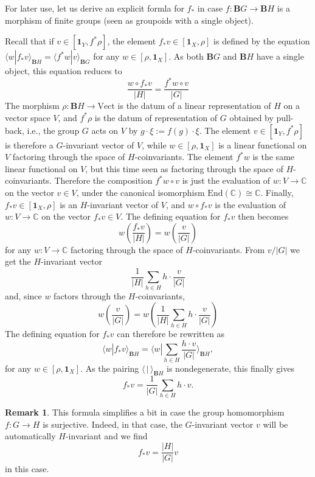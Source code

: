 \documentclass[12pt]{scrartcl}
\theoremstyle{definition}
\newtheorem{remark}[definition]{Remark}
\numberwithin{equation}{section}
\numberwithin{definition}{section}
\numberwithin{figure}{section}
\begin{document}
For  later use, let us derive an explicit formla for $f_*$ in case $f\colon \mathbf{B}G\to \mathbf{B}H$ is a morphism of finite groups (seen as groupoids with a single object).

 Recall that  if $v\in [\mathbf{1}_Y,f^*\rho]$, the element $f_*v\in [\mathbf{1}_X,\rho]$ is defined 
 by the equation $
\langle w| f_*v\rangle_{\mathbf{B}H} = \langle f^*w| v\rangle_{\mathbf{B}G}$
for any $w\in [\rho,\mathbf{1}_X]$. As both $\mathbf{B}G$ and $\mathbf{B}H$ have a single object, this equation reduces to
\[
\frac{w\circ f_*v}{|H|}=\frac{f^*w\circ v}{|G|}
\] 
The morphism $\rho\colon \mathbf{B}H\to \mathrm{Vect}$ is the datum of a linear representation of $H$ on a vector space $V$, and $f^*\rho$ is the datum of representation of $G$ obtained by pull-back, i.e., the group $G$ acts on $V$ by $g\cdot \xi := f(g)\cdot \xi$. The element $v\in [\mathbf{1}_Y,f^*\rho]$ is therefore a $G$-invariant vector of $V$, while $w\in [\rho,\mathbf{1}_X]$ is a linear functional on $V$ factoring through the space of $H$-coinvariants. The element $f^*w$ is the same linear functional on $V$, but this time seen as factoring through the space of $H$-coinvariants. Therefore the composition $f^*w\circ v$ is just the evaluation of $w\colon V\to \mathbb{C}$ on the vector $v\in V$, under the canonical isomorphism $\mathrm{End}(\mathbb{C})\cong \mathbb{C}$. Finally, $f_*v\in  [\mathbf{1}_X,\rho]$ is an $H$-invariant vector of $V$, and $w\circ f_*v$ is the evaluation of $w\colon V\to \mathbb{C}$ on the vector $f_*v\in V$. The defining equation for $f_*v$ then becomes
\[
w\left(\frac{f_*v}{|H|}\right)=w\left(\frac{v}{|G|}\right)
\] 
for any $w\colon V\to \mathbb{C}$ factoring through the space of $H$-coinvariants.
From $v/|G|$ we get the $H$-invariant vector 
\[
\frac{1}{|H|}\sum_{h\in H}h\cdot \frac{v}{|G|}
\]
and, since $w$ factors through the $H$-coinvariants,
\[
w\left(\frac{v}{|G|}\right)=w\left(\frac{1}{|H|}\sum_{h\in H}h\cdot \frac{v}{|G|}\right)
\]
The defining equation for $f_*v$ can therefore be rewritten as
\[
\langle w| f_*v\rangle_{\mathbf{B}H}=\langle w| \sum_{h\in H}\frac{h\cdot v}{|G|}\rangle_{\mathbf{B}H},
\]
for any $w\in [\rho,\mathbf{1}_X]$. As the pairing $\langle \,| \,\rangle_{\mathbf{B}H}$ is nondegenerate, this finally gives
\[
f_*v=\frac{1}{|G|}\sum_{h\in H} h\cdot v.
\] 

\begin{remark}
This formula simplifies a bit in case the group homomorphism $f\colon G\to H$ is surjective. Indeed, in that case, the $G$-invariant vector $v$ will be automatically $H$-invariant and we find
\[
f_*v=\frac{|H|}{|G|} v
\]
in this case.
\end{remark}
\end{document}
